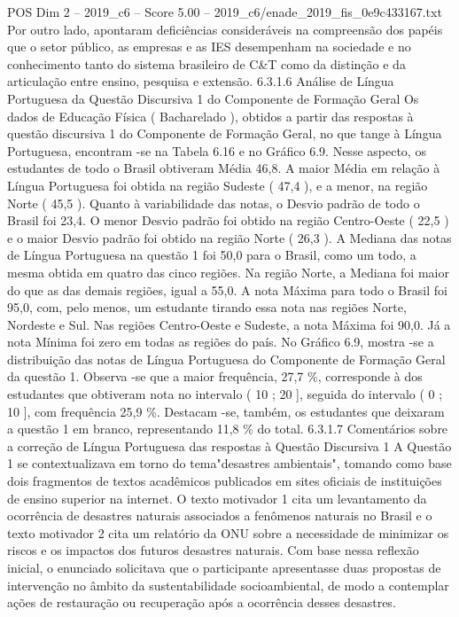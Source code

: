 \begin{textsample}{POS Dim 2 – 2019\_c6 – Score 5.00 – 2019\_c6/enade\_2019\_fis\_0e9c433167.txt}
Por outro lado, apontaram deficiências consideráveis na compreensão dos papéis que o setor público, as empresas e as IES desempenham na sociedade e no conhecimento tanto do sistema brasileiro de C\&T como da distinção e da articulação entre ensino, pesquisa e extensão. 6.3.1.6 Análise de Língua Portuguesa da Questão Discursiva 1 do Componente de Formação Geral Os dados de Educação Física ( Bacharelado ), obtidos a partir das respostas à questão discursiva 1 do Componente de Formação Geral, no que tange à Língua Portuguesa, encontram -se na Tabela 6.16 e no Gráfico 6.9.
Nesse aspecto, os estudantes de todo o Brasil obtiveram Média 46,8.
A maior Média em relação à Língua Portuguesa foi obtida na região Sudeste ( 47,4 ), e a menor, na região Norte ( 45,5 ).
Quanto à variabilidade das notas, o Desvio padrão de todo o Brasil foi 23,4.
O menor Desvio padrão foi obtido na região Centro-Oeste ( 22,5 ) e o maior Desvio padrão foi obtido na região Norte ( 26,3 ).
A Mediana das notas de Língua Portuguesa na questão 1 foi 50,0 para o Brasil, como um todo, a mesma obtida em quatro das cinco regiões.
Na região Norte, a Mediana foi maior do que as das demais regiões, igual a 55,0.
A nota Máxima para todo o Brasil foi 95,0, com, pelo menos, um estudante tirando essa nota nas regiões Norte, Nordeste e Sul.
Nas regiões Centro-Oeste e Sudeste, a nota Máxima foi 90,0.
Já a nota Mínima foi zero em todas as regiões do país.
No Gráfico 6.9, mostra -se a distribuição das notas de Língua Portuguesa do Componente de Formação Geral da questão 1.
Observa -se que a maior frequência, 27,7 \%, corresponde à dos estudantes que obtiveram nota no intervalo ( 10 ; 20 ], seguida do intervalo ( 0 ; 10 ], com frequência 25,9 \%.
Destacam -se, também, os estudantes que deixaram a questão 1 em branco, representando 11,8 \% do total. 6.3.1.7 Comentários sobre a correção de Língua Portuguesa das respostas à Questão Discursiva 1 A Questão 1 se contextualizava em torno do tema"desastres ambientais", tomando como base dois fragmentos de textos acadêmicos publicados em sites oficiais de instituições de ensino superior na internet.
O texto motivador 1 cita um levantamento da ocorrência de desastres naturais associados a fenômenos naturais no Brasil e o texto motivador 2 cita um relatório da ONU sobre a necessidade de minimizar os riscos e os impactos dos futuros desastres naturais.
Com base nessa reflexão inicial, o enunciado solicitava que o participante apresentasse duas propostas de intervenção no âmbito da sustentabilidade socioambiental, de modo a contemplar ações de restauração ou recuperação após a ocorrência desses desastres.

\end{textsample}
